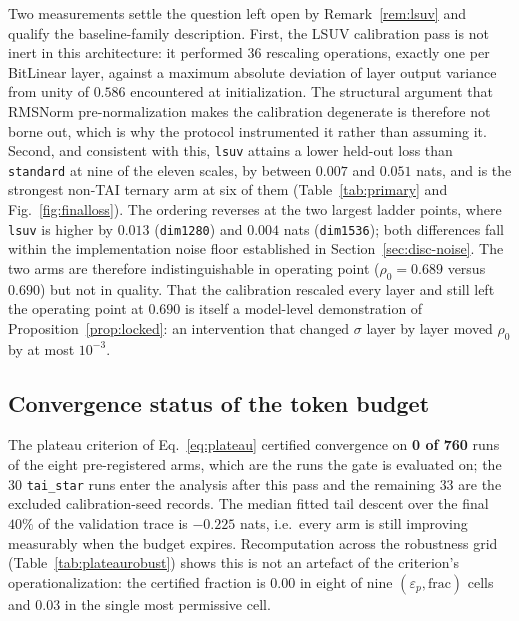 \documentclass[final,5p,times,twocolumn]{elsarticle}
\theoremstyle{remark}
\newcommand{\rhoz}{\rho_{0}}
\begin{document}
Two measurements settle the question left open by Remark~\ref{rem:lsuv} and
qualify the baseline-family description. First, the LSUV calibration pass is
not inert in this architecture: it performed $36$ rescaling
operations, exactly one per BitLinear layer, against a maximum absolute
deviation of layer output variance from unity of $0.586$ encountered at
initialization. The structural argument that RMSNorm pre-normalization makes
the calibration degenerate is therefore not borne out, which is why the
protocol instrumented it rather than assuming it. Second, and consistent with this, \texttt{lsuv}
attains a lower held-out loss than \texttt{standard} at nine of the eleven
scales, by between $0.007$ and $0.051$ nats, and is the strongest non-TAI
ternary arm at six of them (Table~\ref{tab:primary} and
Fig.~\ref{fig:finalloss}). The ordering reverses at the two largest ladder
points, where \texttt{lsuv} is higher by $0.013$ (\texttt{dim1280}) and
$0.004$ nats (\texttt{dim1536}); both differences fall within the
implementation noise floor established in Section~\ref{sec:disc-noise}. The two arms are therefore indistinguishable in
operating point ($\rhoz = 0.689$ versus $0.690$) but not in
quality. That the calibration rescaled every layer and still left the
operating point at $0.690$ is itself a model-level demonstration of
Proposition~\ref{prop:locked}: an intervention that changed $\sigma$ layer by
layer moved $\rhoz$ by at most $10^{-3}$.

\subsection{Convergence status of the token budget}
\label{sec:res-budget}

The plateau criterion of Eq.~\eqref{eq:plateau} certified convergence on
\textbf{0 of 760} runs of the eight pre-registered arms, which are the runs
the gate is evaluated on; the $30$ \texttt{tai\_star} runs enter the analysis
after this pass and the remaining $33$ are the excluded calibration-seed
records. The median fitted tail descent over the final
$40\%$ of the validation trace is $-0.225$ nats, i.e.\ every arm is still
improving measurably when the budget expires. Recomputation across the
robustness grid (Table~\ref{tab:plateaurobust}) shows this is not an artefact
of the criterion's operationalization: the certified fraction is $0.00$ in
eight of nine $(\varepsilon_p, \mathrm{frac})$ cells and $0.03$ in the single
most permissive cell.
\end{document}

